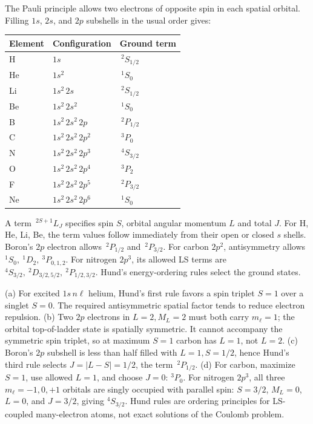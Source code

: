The Pauli principle allows two electrons of opposite
spin in each spatial orbital. Filling $1s$, $2s$,
and $2p$ subshells in the usual order gives:
\begin{center}\begin{tabular}{lll}\toprule
Element&Configuration&Ground term\\\midrule
H&$1s$&$\,{}^{2}S_{1/2}$\\
He&$1s^2$&$\,{}^{1}S_0$\\
Li&$1s^2\,2s$&$\,{}^{2}S_{1/2}$\\
Be&$1s^2\,2s^2$&$\,{}^{1}S_0$\\
B&$1s^2\,2s^2\,2p$&$\,{}^{2}P_{1/2}$\\
C&$1s^2\,2s^2\,2p^2$&$\,{}^{3}P_0$\\
N&$1s^2\,2s^2\,2p^3$&$\,{}^{4}S_{3/2}$\\
O&$1s^2\,2s^2\,2p^4$&$\,{}^{3}P_2$\\
F&$1s^2\,2s^2\,2p^5$&$\,{}^{2}P_{3/2}$\\
Ne&$1s^2\,2s^2\,2p^6$&$\,{}^{1}S_0$\\\bottomrule
\end{tabular}\end{center}
A term $\,{}^{2S+1}L_J$ specifies
spin $S$, orbital angular momentum $L$ and
total $J$. For H, He, Li, Be, the term values
follow immediately from their open or
closed $s$ shells. Boron's $2p$ electron
allows $\,{}^{2}P_{1/2}$ and $\,{}^{2}P_{3/2}$.
For carbon $2p^2$, antisymmetry allows
$\boxed{{}^{1}S_0,\ {}^{1}D_2,\ {}^{3}P_{0,1,2}}$.
For nitrogen $2p^3$, its allowed LS terms are
$\boxed{{}^{4}S_{3/2},\ {}^{2}D_{3/2,5/2},\
{}^{2}P_{1/2,3/2}}$.
Hund's energy-ordering rules select the
ground states.

(a) For excited $1s\,n\ell$ helium,
Hund's first rule favors a spin triplet
$S=1$ over a singlet $S=0$.
The required antisymmetric spatial
factor tends to reduce electron repulsion.
(b) Two $2p$ electrons in $L=2,M_L=2$
must both carry $m_\ell=1$; the orbital
top-of-ladder state is spatially symmetric.
It cannot accompany the symmetric spin
triplet, so at maximum $S=1$ carbon
has $L=1$, not $L=2$.
(c) Boron's $2p$ subshell is less than
half filled with $L=1,S=1/2$, hence
Hund's third rule selects
$\boxed{J=|L-S|=1/2}$,
the term $\,{}^{2}P_{1/2}$.
(d) For carbon, maximize $S=1$, use
allowed $L=1$, and choose $J=0$:
$\boxed{{}^{3}P_0}$.
For nitrogen $2p^3$, all three
$m_\ell=-1,0,+1$ orbitals are singly
occupied with parallel spin:
$S=3/2$, $M_L=0$, $L=0$, and
$J=3/2$, giving
$\boxed{{}^{4}S_{3/2}}$.
Hund rules are ordering principles
for LS-coupled many-electron atoms,
not exact solutions of the Coulomb problem.

